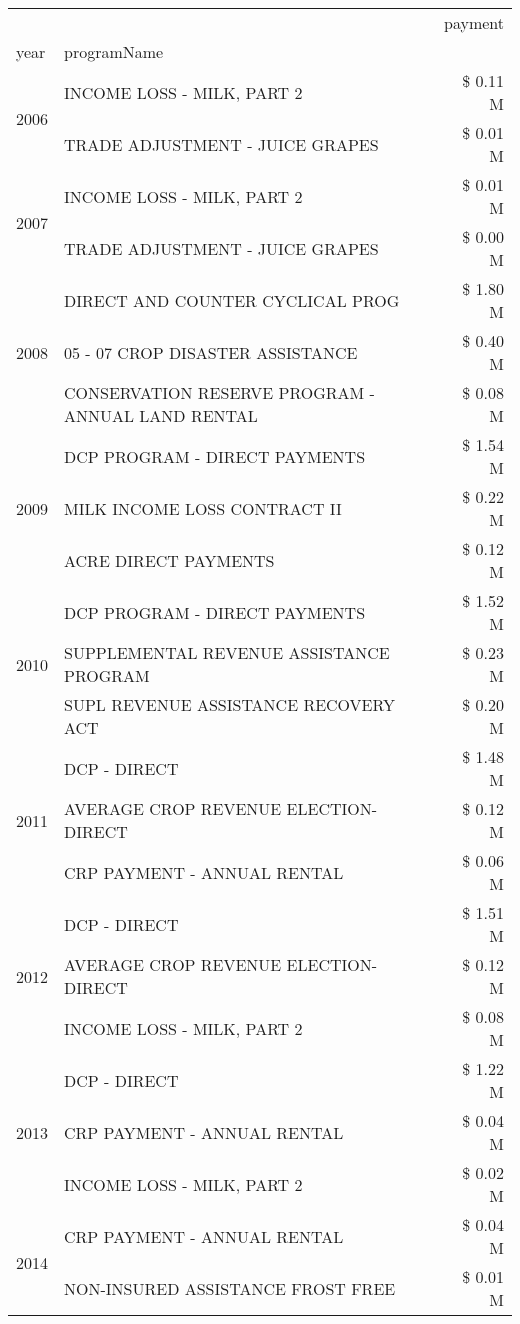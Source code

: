 \begin{tabular}{llr}
\toprule
 &  & payment \\
year & programName &  \\
\midrule
\multirow[t]{2}{*}{2006} & INCOME LOSS - MILK, PART 2 & \$ 0.11 M \\
 & TRADE ADJUSTMENT - JUICE GRAPES & \$ 0.01 M \\
\cline{1-3}
\multirow[t]{2}{*}{2007} & INCOME LOSS - MILK, PART 2 & \$ 0.01 M \\
 & TRADE ADJUSTMENT - JUICE GRAPES & \$ 0.00 M \\
\cline{1-3}
\multirow[t]{3}{*}{2008} & DIRECT AND COUNTER CYCLICAL PROG & \$ 1.80 M \\
 & 05 - 07 CROP DISASTER ASSISTANCE & \$ 0.40 M \\
 & CONSERVATION RESERVE PROGRAM - ANNUAL LAND RENTAL & \$ 0.08 M \\
\cline{1-3}
\multirow[t]{3}{*}{2009} & DCP PROGRAM - DIRECT PAYMENTS & \$ 1.54 M \\
 & MILK INCOME LOSS CONTRACT II & \$ 0.22 M \\
 & ACRE DIRECT PAYMENTS & \$ 0.12 M \\
\cline{1-3}
\multirow[t]{3}{*}{2010} & DCP PROGRAM - DIRECT PAYMENTS & \$ 1.52 M \\
 & SUPPLEMENTAL REVENUE ASSISTANCE PROGRAM & \$ 0.23 M \\
 & SUPL REVENUE ASSISTANCE RECOVERY ACT & \$ 0.20 M \\
\cline{1-3}
\multirow[t]{3}{*}{2011} & DCP - DIRECT & \$ 1.48 M \\
 & AVERAGE CROP REVENUE ELECTION-DIRECT & \$ 0.12 M \\
 & CRP PAYMENT - ANNUAL RENTAL & \$ 0.06 M \\
\cline{1-3}
\multirow[t]{3}{*}{2012} & DCP - DIRECT & \$ 1.51 M \\
 & AVERAGE CROP REVENUE ELECTION-DIRECT & \$ 0.12 M \\
 & INCOME LOSS - MILK, PART 2 & \$ 0.08 M \\
\cline{1-3}
\multirow[t]{3}{*}{2013} & DCP - DIRECT & \$ 1.22 M \\
 & CRP PAYMENT - ANNUAL RENTAL & \$ 0.04 M \\
 & INCOME LOSS - MILK, PART 2 & \$ 0.02 M \\
\cline{1-3}
\multirow[t]{3}{*}{2014} & CRP PAYMENT - ANNUAL RENTAL & \$ 0.04 M \\
 & NON-INSURED ASSISTANCE FROST FREE & \$ 0.01 M \\

\end{tabular}
